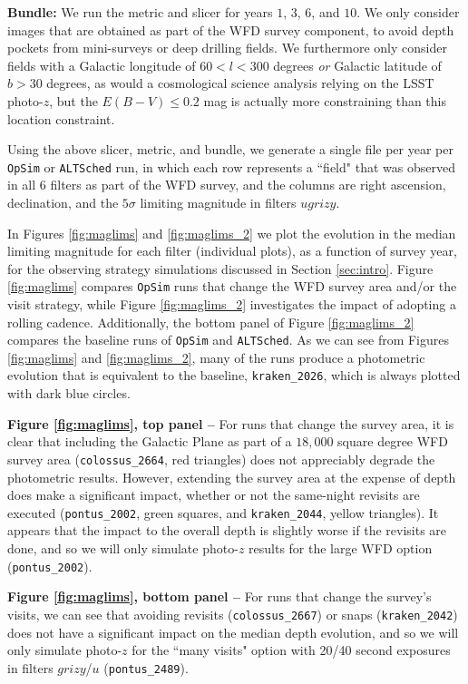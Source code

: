 {\bf Bundle:} We run the metric and slicer for years $1$, $3$, $6$, and $10$. We only consider images that are obtained as part of the WFD survey component, to avoid depth pockets from mini-surveys or deep drilling fields. We furthermore only consider fields with a Galactic longitude of $60 < l < 300$ degrees {\em or} Galactic latitude of $b>30$ degrees, as would a cosmological science analysis relying on the LSST photo-$z$, but the $E(B-V) \leq 0.2$ mag is actually more constraining than this location constraint.

Using the above slicer, metric, and bundle, we generate a single file per year per {\tt OpSim} or {\tt ALTSched} run, in which each row represents a ``field" that was observed in all $6$ filters as part of the WFD survey, and the columns are right ascension, declination, and the $5{\sigma}$ limiting magnitude in filters $ugrizy$. 

In Figures \ref{fig:maglims} and \ref{fig:maglims_2} we plot the evolution in the median limiting magnitude for each filter (individual plots), as a function of survey year, for the observing strategy simulations discussed in Section \ref{sec:intro}. Figure \ref{fig:maglims} compares {\tt OpSim} runs that change the WFD survey area and/or the visit strategy, while Figure \ref{fig:maglims_2} investigates the impact of adopting a rolling cadence. Additionally, the bottom panel of Figure \ref{fig:maglims_2} compares the baseline runs of {\tt OpSim} and {\tt ALTSched}. As we can see from Figures \ref{fig:maglims} and \ref{fig:maglims_2}, many of the runs produce a photometric evolution that is equivalent to the baseline, {\tt kraken\_2026}, which is always plotted with dark blue circles. 

{\bf Figure \ref{fig:maglims}, top panel --} For runs that change the survey area, it is clear that including the Galactic Plane as part of a $18,000$ square degree WFD survey area ({\tt colossus\_2664}, red triangles) does not appreciably degrade the photometric results. However, extending the survey area at the expense of depth does make a significant impact, whether or not the same-night revisits are executed ({\tt pontus\_2002}, green squares, and {\tt kraken\_2044}, yellow triangles). It appears that the impact to the overall depth is slightly worse if the revisits are done, and so we will only simulate photo-$z$ results for the large WFD option ({\tt pontus\_2002}). 

{\bf Figure \ref{fig:maglims}, bottom panel --} For runs that change the survey's visits, we can see that avoiding revisits ({\tt colossus\_2667}) or snaps ({\tt kraken\_2042}) does not have a significant impact on the median depth evolution, and so we will only simulate photo-$z$ for the ``many visits" option with 20/40 second exposures in filters $grizy$/$u$ ({\tt pontus\_2489}). 


